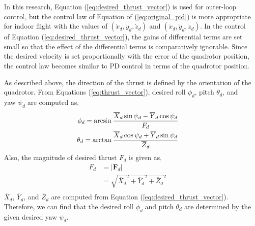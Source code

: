 In this research, Equation (\ref{eq:desired_thrust_vector}) is used for outer-loop control, but the control law of Equation of (\ref{eq:original_pid}) is more appropriate for indoor flight with the values of \((\dot{x}_d, \dot{ y}_d, \dot{z}_d)\) and \((\ddot{x}_d, \ddot{ y}_d, \ddot{z}_d)\). In the control of Equation (\ref{eq:desired_thrust_vector}), the gains of differential terms are set small so that the effect of the differential terms is comparatively ignorable. Since the desired velocity is set proportionally with the error of the quadrotor position, the control law becomes similar to PD control in terms of the quadrotor position.

As described above, the direction of the thrust is defined by the orientation of the quadrotor. From Equations (\ref{eq:thrust_vector}), desired roll \(\phi_d\), pitch \(\theta_d\), and yaw \(\psi_d\) are computed as,
\begin{equation}
\label{eq:desired_attitude}
\begin{aligned}
\phi_d = \arcsin {{{{\overline X}_d} \sin{\psi_d} - {{\overline Y}_d} \cos{\psi_d}} \over {F_d}}\\
\theta_d = \arctan {{{{\overline X}_d} \cos{\psi_d} + {{\overline Y}_d} \sin{\psi_d}} \over {{\overline Z}_d}}\\
\end{aligned}
\end{equation}
Also, the magnitude of desired thrust \(F_d\) is given as,\\
\begin{equation}
\begin{aligned}
F_d & = | {\boldsymbol F}_d | \\
& =  \sqrt{{{\overline X}_d}^2 + {{\overline Y}_d}^2 + {{\overline Z}_d}^2}\\
\end{aligned}
\end{equation}
\( {{\overline X}_d} \), \({{\overline Y}_d}\), and \({{\overline Z}_d}\) are computed from Equation (\ref{eq:desired_thrust_vector}). Therefore, we can find that the desired roll \(\phi_d\) and pitch \(\theta_d\) are determined by the given desired yaw \(\psi_d\). 
